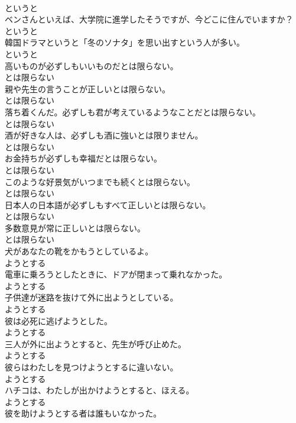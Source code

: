 \documentclass[8pt]{extreport}
\begin{document}
\begin{CJK}{UTF8}{min}
\\	というと	
\\	ベンさんといえば、大学院に進学したそうですが、今どこに住んでいますか？	
\\	というと	
\\	韓国ドラマというと「冬のソナタ」を思い出すという人が多い。	
\\	というと	
\\	高いものが必ずしもいいものだとは限らない。	
\\	とは限らない	
\\	親や先生の言うことが正しいとは限らない。	
\\	とは限らない	
\\	落ち着くんだ。必ずしも君が考えているようなことだとは限らない。	
\\	とは限らない	
\\	酒が好きな人は、必ずしも酒に強いとは限りません。	
\\	とは限らない	
\\	お金持ちが必ずしも幸福だとは限らない。	
\\	とは限らない	
\\	このような好景気がいつまでも続くとは限らない。	
\\	とは限らない	
\\	日本人の日本語が必ずしもすべて正しいとは限らない。	
\\	とは限らない	
\\	多数意見が常に正しいとは限らない。	
\\	とは限らない	
\\	犬があなたの靴をかもうとしているよ。	
\\	ようとする	
\\	電車に乗ろうとしたときに、ドアが閉まって乗れなかった。	
\\	ようとする	
\\	子供達が迷路を抜けて外に出ようとしている。	
\\	ようとする	
\\	彼は必死に逃げようとした。	
\\	ようとする	
\\	三人が外に出ようとすると、先生が呼び止めた。	
\\	ようとする	
\\	彼らはわたしを見つけようとするに違いない。	
\\	ようとする	
\\	ハチコは、わたしが出かけようとすると、ほえる。	
\\	ようとする	
\\	彼を助けようとする者は誰もいなかった。	

\end{CJK}
\end{document}
